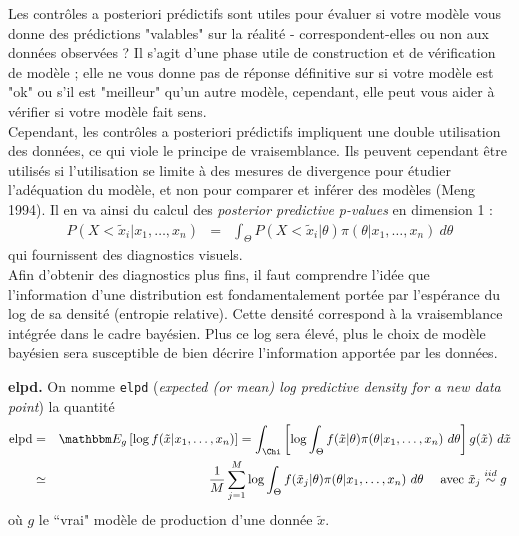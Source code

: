 Les contrôles a posteriori prédictifs sont utiles pour évaluer si votre modèle vous donne des prédictions "valables" sur la réalité - correspondent-elles ou non aux données observées ? Il s'agit d'une phase utile de construction et de vérification de modèle ; elle ne vous donne pas de réponse définitive sur si votre modèle est "ok" ou s'il est "meilleur" qu'un autre modèle, cependant, elle peut vous aider à vérifier si votre modèle fait sens. \\

Cependant, les contrôles a posteriori prédictifs  impliquent une double utilisation des données, ce qui viole le principe de vraisemblance. Ils peuvent cependant être utilisés si l'utilisation se limite à des mesures de divergence pour étudier l'adéquation du modèle, et non pour comparer et inférer des modèles (Meng 1994). Il en va ainsi du calcul des \emph{posterior predictive p-values} en dimension 1 :
\begin{eqnarray*}
P\left(X<\tilde{x}_i|x_1,\ldots,x_n\right) & = &  \int_{\Theta} P(X<\tilde{x}_i|\theta) \pi(\theta|x_1,\ldots,x_n) \ d\theta
\end{eqnarray*}
qui fournissent des diagnostics visuels. \\

Afin d'obtenir des diagnostics plus fins, il faut comprendre l'idée que l'information d'une distribution est fondamentalement portée par l'espérance du log de sa densité (entropie relative). Cette densité correspond à la vraisemblance intégrée dans le cadre bayésien. Plus ce log sera élevé, plus le choix de modèle bayésien sera susceptible de bien décrire l'information apportée par les données. 

\begin{definition}{\bf elpd.}
On nomme \texttt{elpd} ({\it expected (or mean) log predictive density for a new data point}) la quantité
\begin{eqnarray*}
\mbox{elpd} & = &  \E_g\left[\log  f(\tilde{x}|x_1,\ldots,x_n)\right]  =  \int_{\Chi}\left[\log \int_{\Theta} f(\tilde{x}|\theta) \pi(\theta|x_1,\ldots,x_n) \ d\theta\right] g(\tilde{x}) \ d\tilde{x} \\
& \simeq & \frac{1}{M} \sum\limits_{j=1}^M \log \int_{\Theta} f(\tilde{x}_j|\theta) \pi(\theta|x_1,\ldots,x_n) \ d\theta \ \ \ \ \text{avec $\tilde{x}_j\overset{iid}{\sim} g$ }
\end{eqnarray*}
où $g$ le ``vrai" modèle de production d'une donnée $\tilde{x}$.
\end{definition}

